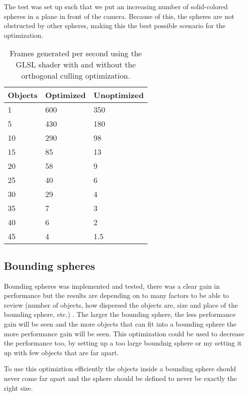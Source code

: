 			The test was set up such that we put an increasing number of
			solid-colored spheres in a plane in front of the camera. Because of
			this, the spheres are not obstructed by other spheres, making this
			the best possible scenario for the optimization.

			\begin{table}
			\centering
			\begin{tabular}{lll}
				\hline
				Objects & Optimized & Unoptimized \\ 
				\hline
				1       & 600       & 350         \\ 
				5       & 430       & 180         \\			
				10      & 290       & 98          \\
				15      & 85        & 13          \\
				20      & 58        & 9           \\
				25      & 40        & 6           \\
				30      & 29        & 4           \\
				35      & 7         & 3           \\
				40      & 6         & 2           \\
				45      & 4         & 1.5         \\
				\hline
			\end{tabular}
			\caption{Frames generated per second using the GLSL shader with and
				without the orthogonal culling optimization.}
			\end{table}

		\subsection{Bounding spheres}

			Bounding spheres was implemented and tested, there was a clear
			gain in performance but the results are depending on to many 
			factors to be able to review (number of objects, how dispersed the objects are, 
			size and place of the bounding sphere, etc.) . The larger the bounding sphere, the 
			less performance gain will be seen and the more objects that can 
			fit into a bounding sphere the more performance gain will be seen.
			This optimization could be used to decrease the performance too, by
			setting up a too large boundnig sphere or my setting it up with few
			objects that are far apart.

			To use this optimiztion efficiently the objects inside a bounding 
			sphere should never come far apart and the sphere should be defined
			to never be exactly the right size. 